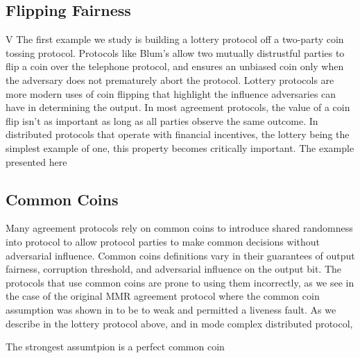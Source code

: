 \subsection{Flipping Fairness}V
The first example we study is building a lottery protocol off a two-party coin tossing protocol.
Protocols like Blum's allow two mutually distrustful parties to flip a coin over the telephone protocol, and ensures an unbiased coin only when the adversary does not prematurely abort the protocol.
Lottery protocols are more modern uses of coin flipping that highlight the influence adversaries can have in determining the output.
In most agreement protocols, the value of a coin flip isn't as important as long as all parties observe the same outcome.
In distributed protocols that operate with financial incentives, the lottery being the simplest example of one, this property becomes critically important. 
The example presented here 



\subsection{Common Coins}
Many agreement protocols rely on common coins to introduce shared randomness into protocol to allow protocol parties to make common decisions without adversarial influence.
Common coins definitions vary in their guarantees of output fairness, corruption threshold, and adversarial influence on the output bit.
The protocols that use common coins are prone to using them incorrectly, as we see in the case of the original MMR agreement protocol where the common coin assumption was shown in \cite{formalbyz} to be to weak and permitted a liveness fault.
As we describe in the lottery protocol above, and in mode complex distributed protocol, 

The strongest assumtpion is a perfect common coin
